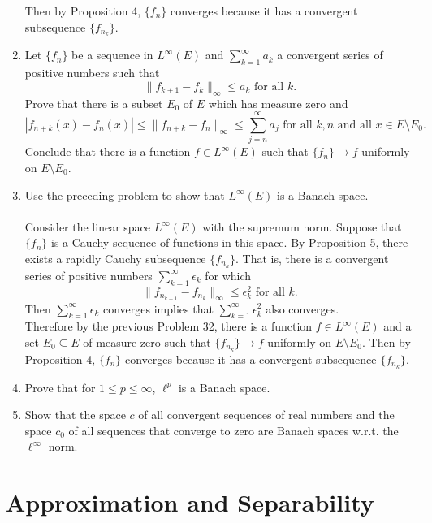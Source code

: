 \begin{enumerate}
	Then by Proposition 4, $\{f_n\}$ converges because it has a convergent subsequence $\{f_{n_k}\}$. 
	\item Let $\{f_n\}$ be a sequence in $L^\infty(E)$ and $\sum_{k=1}^\infty a_k$ a convergent series of positive numbers such that
	\[
		\|f_{k+1}-f_k\|_{\infty}\le a_k\text{ for all }k.
	\]
	Prove that there is a subset $E_0$ of $E$ which has measure zero and 
	\[
		|f_{n+k}(x)-f_n(x)|\le\|f_{n+k}-f_n\|_{\infty}\le\sum_{j=n}^\infty a_j\text{ for all }k,n\text{ and all }x\in E\setminus E_0.
	\]
	Conclude that there is a function $f\in L^\infty(E)$ such that $\{f_n\}\to f$ uniformly on $E\setminus E_0$.
	\item Use the preceding problem to show that $L^\infty(E)$ is a Banach space.\\
	\\Consider the linear space $L^\infty(E)$ with the supremum norm. 
	Suppose that $\{f_n\}$ is a Cauchy sequence of functions in this space.
	By Proposition 5, there exists a rapidly Cauchy subsequence $\{f_{n_k}\}$.
	That is, there is a convergent series of positive numbers $\sum_{k=1}^\infty\epsilon_k$ for which
	\[
		\|f_{n_{k+1}}-f_{n_k}\|_{\infty}\le\epsilon_k^2\text{ for all }k.
	\]
	Then $\sum_{k=1}^\infty\epsilon_k$ converges implies that $\sum_{k=1}^\infty\epsilon_k^2$ also converges.
	\\Therefore by the previous Problem 32, there is a function $f\in L^\infty(E)$ and a set $E_0\subseteq E$ of measure zero such that $\{f_{n_k}\}\to f$ uniformly on $E\setminus E_0$.
	Then by Proposition 4, $\{f_n\}$ converges because it has a convergent subsequence $\{f_{n_k}\}$. 
	\item Prove that for $1\le p\le\infty$, $\ell^p$ is a Banach space.
	\item Show that the space $c$ of all convergent sequences of real numbers and the space $c_0$ of all sequences that converge to zero are Banach spaces w.r.t. the $\ell^\infty$ norm. 
\end{enumerate}

\section{Approximation and Separability}

